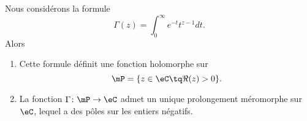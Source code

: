 \begin{theorem}   \label{ThoZJYooWKfbVz}
    Nous considérons la formule
    \begin{equation}
        \Gamma(z)=\int_0^{\infty} e^{-t}t^{z-1}dt.
    \end{equation}
    Alors
    \begin{enumerate}
        \item
            Cette formule définit une fonction holomorphe sur
            \begin{equation}
                \mP=\{ z\in \eC\tq \Re(z)>0 \}.
            \end{equation}
        \item
            La fonction \( \Gamma\colon \mP\to \eC\) admet un unique prolongement méromorphe sur \( \eC\), lequel a des pôles sur les entiers négatifs.
    \end{enumerate}
\end{theorem}

